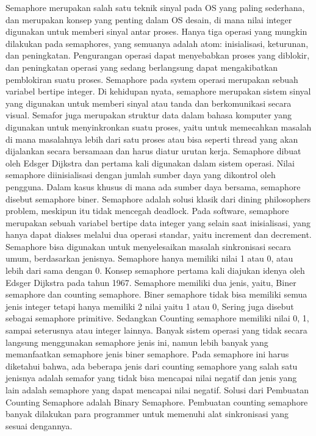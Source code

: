 		Semaphore merupakan salah satu teknik sinyal pada OS yang paling sederhana, dan merupakan konsep yang penting dalam OS desain, di mana nilai integer digunakan untuk memberi sinyal antar proses. 
		Hanya tiga operasi yang mungkin dilakukan pada semaphores, yang semuanya adalah atom: inisialisasi, keturunan, dan peningkatan. 
		Pengurangan operasi dapat menyebabkan proses yang diblokir, dan peningkatan operasi yang sedang berlangsung dapat mengakibatkan pemblokiran suatu proses. 
		Semaphore pada system operasi merupakan sebuah variabel bertipe integer. Di kehidupan nyata, semaphore merupakan sistem sinyal yang digunakan untuk memberi sinyal atau tanda dan berkomunikasi secara visual. 
		Semafor juga merupakan struktur data dalam bahasa komputer yang digunakan untuk menyinkronkan suatu proses, yaitu untuk memecahkan masalah di mana masalahnya lebih dari satu proses atau bisa 
		seperti thread yang akan dijalankan secara bersamaan dan harus diatur urutan kerja. Semaphore dibuat oleh Edsger Dijkstra dan pertama kali digunakan dalam sistem operasi.
		Nilai semaphore diinisialisasi dengan jumlah sumber daya yang dikontrol oleh pengguna. Dalam kasus khusus di mana ada sumber daya bersama, semaphore disebut semaphore biner. 
		Semaphore adalah solusi klasik dari dining philosophers problem, meskipun itu tidak mencegah deadlock.
		Pada software, semaphore merupakan sebuah variabel bertipe data integer yang selain saat inisialisasi, yang hanya dapat diakses melalui dua operasi standar, yaitu increment dan decrement. 
		Semaphore bisa digunakan untuk menyelesaikan masalah sinkronisasi secara umum, berdasarkan jenisnya. Semaphore hanya memiliki nilai 1 atau 0, atau lebih dari sama dengan 0. 
		Konsep semaphore pertama kali diajukan idenya oleh Edsger Dijkstra pada tahun 1967. Semaphore memiliki dua jenis, yaitu, Biner semaphore dan counting semaphore. 
		Biner semaphore tidak bisa memiliki semua jenis integer tetapi hanya memiliki 2 nilai yaitu 1 atau 0, Sering juga disebut sebagai semaphore primitive. Sedangkan Counting semaphore memiliki nilai 0, 1, sampai seterusnya atau integer lainnya. 
		Banyak sistem operasi yang tidak secara langsung menggunakan semaphore jenis ini, namun lebih banyak yang memanfaatkan semaphore jenis biner semaphore. 
		Pada semaphore ini harus diketahui bahwa, ada beberapa jenis dari counting semaphore yang salah satu jenisnya adalah semafor yang tidak bisa mencapai nilai negatif dan jenis yang lain adalah semaphore yang dapat mencapai nilai negatif. 
		Solusi dari Pembuatan Counting Semaphore adalah Binary Semaphore. Pembuatan counting semaphore banyak dilakukan para programmer untuk memenuhi alat sinkronisasi yang sesuai dengannya. 
		
